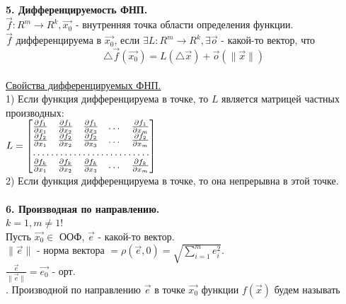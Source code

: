 \documentclass[12pt]{article}
\begin{document}
\\
\label{question5_1}\textbf{5. Дифференцируемость ФНП.}\\
$\overrightarrow{f} : R^m \to R^k, \overrightarrow{x_0}$ - внутренняя точка области определения функции.\\
$\overrightarrow{f}$ дифференцируема в $\overrightarrow{x_0}$, если $\exists L : R^m \to R^k, \exists \overrightarrow{o}$ - какой-то вектор, что\\
$$\bigtriangleup \overrightarrow{f} (\overrightarrow{x_0}) = L(\bigtriangleup \overrightarrow{x}) + \overrightarrow{o} (\|\overrightarrow{x}\|)$$
\\
\label{question5_2}\underline{Свойства дифференцируемых ФНП.}\\
1) Если функция дифференцируема в точке, то $L$ является матрицей частных производных:\\
$L = \begin{bmatrix}
   \frac{\partial f_1}{\partial x_1} & \frac{\partial f_1}{\partial x_2} & \frac{\partial f_1}{\partial x_3} & \dots & \frac{\partial f_1}{\partial x_m} \\
   \frac{\partial f_2}{\partial x_1} & \frac{\partial f_2}{\partial x_2} & \frac{\partial f_2}{\partial x_3} & \dots & \frac{\partial f_2}{\partial x_m} \\
    \hdotsfor{5} \\
    \frac{\partial f_k}{\partial x_1} & \frac{\partial f_k}{\partial x_2} & \frac{\partial f_k}{\partial x_3} & \dots & \frac{\partial f_k}{\partial x_m} \\
\end{bmatrix}
$\\
2) Если функция дифференцируема в точке, то она непрерывна в этой точке.\\
\\
\label{question6}\textbf{6. Производная по направлению.}\\
$k = 1, m \neq 1$!\\
Пусть $\overrightarrow{x_0} \in$ ООФ, $\overrightarrow{e}$ - какой-то вектор.\\
$\| \overrightarrow{e} \|$ - норма вектора $= \rho(\overrightarrow{e}, 0) = \sqrt{\sum_{i=1}^m e_i^2}$.\\
$\frac{\overrightarrow{e}}{\| \overrightarrow{e} \|} = \overrightarrow{e_0}$ - орт.\\
\indent {}. Производной по направлению $\overrightarrow{e}$ в точке $\overrightarrow{x_0}$ функции $f(\overrightarrow{x})$ будем называть\\
\end{document}
